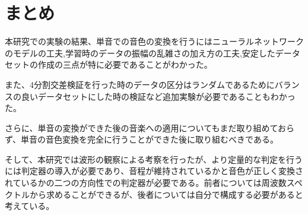 \chapter{まとめ}

本研究での実験の結果、単音での音色の変換を行うにはニューラルネットワークのモデルの工夫,学習時のデータの振幅の乱雑さの加え方の工夫,安定したデータセットの作成の三点が特に必要であることがわかった。

また、4分割交差検証を行った時のデータの区分はランダムであるためにバランスの良いデータセットにした時の検証など追加実験が必要であることもわかった。

さらに、単音の変換ができた後の音楽への適用についてもまだ取り組めておらず、単音の音色変換を完全に行うことができた後に取り組むべきである。

そして、本研究では波形の観察による考察を行ったが、より定量的な判定を行うには判定器の導入が必要であり、音程が維持されているかと音色が正しく変換されているかの二つの方向性での判定器が必要である。前者については周波数スペクトルから求めることができるが、後者については自分で構成する必要があると考えている。